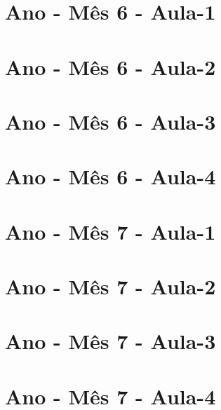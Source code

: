 \begin{multicols}{2}
\section[\sffamily 1\textordmasculine\space Ano - Mês 6 - Aula-1]{\textordmasculine\space Ano - Mês 6 - Aula-1}


\section[\sffamily 1\textordmasculine\space Ano - Mês 6 - Aula-2]{\textordmasculine\space Ano - Mês 6 - Aula-2}


\section[\sffamily 1\textordmasculine\space Ano - Mês 6 - Aula-3]{\textordmasculine\space Ano - Mês 6 - Aula-3}


\section[\sffamily 1\textordmasculine\space Ano - Mês 6 - Aula-4]{\textordmasculine\space Ano - Mês 6 - Aula-4}


\section[\sffamily 1\textordmasculine\space Ano - Mês 7 - Aula-1]{\textordmasculine\space Ano - Mês 7 - Aula-1}


\section[\sffamily 1\textordmasculine\space Ano - Mês 7 - Aula-2]{\textordmasculine\space Ano - Mês 7 - Aula-2}


\section[\sffamily 1\textordmasculine\space Ano - Mês 7 - Aula-3]{\textordmasculine\space Ano - Mês 7 - Aula-3}


\section[\sffamily 1\textordmasculine\space Ano - Mês 7 - Aula-4]{\textordmasculine\space Ano - Mês 7 - Aula-4}



\end{multicols}
